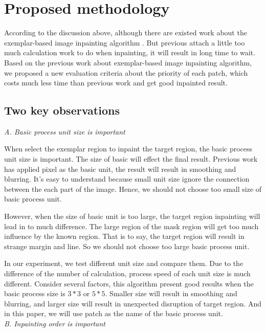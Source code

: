 \section{Proposed methodology}
According to the discussion above, although there are existed work about the exemplar-based image inpainting algorithm \etal\cite{cvpr03,tip04}. But previous attach a little too much calculation work to do when inpainting, it will result in long time to wait. Based on the previous work about exemplar-based image inpainting algorithm, we proposed a new evaluation criteria about the priority of each patch, which costs much less time than previous work and get good inpainted result.
\subsection{Two key observations}
\noindent \emph{A. Basic process unit size is important}

When select the exemplar region to inpaint the target region, the basic process unit size is important. The size of basic will effect the final result. Previous work has applied pixel as the basic unit\cite{iccv99}, the result will result in smoothing and blurring. It's easy to understand because small unit size ignore the connection between the each part of the image. Hence, we should not choose too small size of basic process unit. 

However, when the size of basic unit is too large, the target region inpainting will lead in to much difference. The large region of the mask region will get too much influence by the known region. That is to say, the target region will result in strange margin and line. So we should not choose too large basic process unit.

In our experiment, we test different unit size and compare them. Due to the difference of the number of calculation, process speed of each unit size is much different. Consider several factors, this algorithm present good results when the basic process size is $3*3$ or $5*5$.  Smaller size will result in smoothing and blurring, and larger size will result in unexpected disruption of target region. And in this paper, we will use patch as the name of the basic process unit.\\

\noindent \emph{B. Inpainting order is important}

